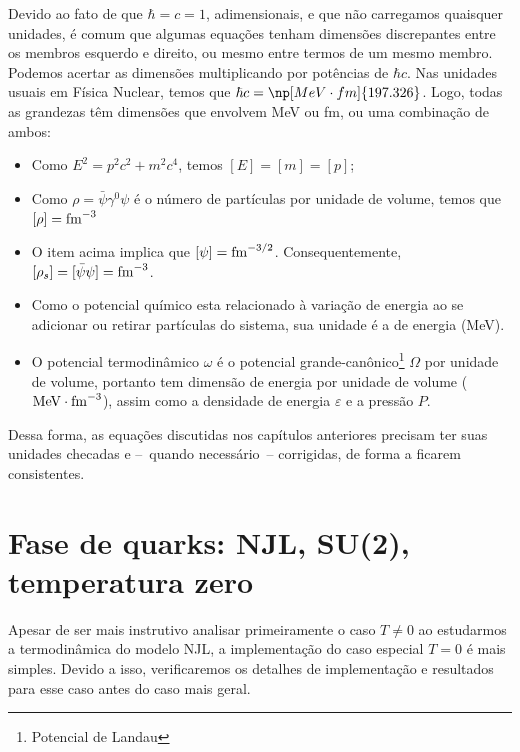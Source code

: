 Devido ao fato de que $\hbar = c = 1$, adimensionais, e que não carregamos quaisquer unidades, é comum que algumas equações tenham dimensões discrepantes entre os membros esquerdo e direito, ou mesmo entre termos de um mesmo membro. Podemos acertar as dimensões multiplicando por potências de $\hbar c$. Nas unidades usuais em Física Nuclear, temos que $\hbar c = \np[MeV\cdot fm]{197.326}$. Logo, todas as grandezas têm dimensões que envolvem MeV ou fm, ou uma combinação de ambos:

\begin{itemize}
	\item Como $E^2 = p^2c^2 + m^2c^4$, temos $[E] = [m] = [p]$;
	\item Como $\rho = \bar{\psi}\gamma^0\psi$ é o número de partículas por unidade de volume, temos que $[\rho] = \rm{fm}^{-3}$
	\item O item acima implica que $[\psi] = \rm{fm}^{-3/2}$. Consequentemente, $[\rho_s] = [\bar{\psi}\psi] = \rm{fm}^{-3}$. 
	\item Como o potencial químico esta relacionado à variação de energia ao se adicionar ou retirar partículas do sistema, sua unidade é a de energia (MeV).
	\item O potencial termodinâmico $\omega$ é o potencial grande-canônico\footnote{Potencial de Landau} $\Omega$ por unidade de volume, portanto tem dimensão de energia por unidade de volume ($\rm{MeV}\cdot\rm{fm}^{-3}$), assim como a densidade de energia $\varepsilon$ e a pressão $P$.
\end{itemize}
%
Dessa forma, as equações discutidas nos capítulos anteriores precisam ter suas unidades checadas e --~quando necessário~-- corrigidas, de forma a ficarem consistentes.

\section{Fase de quarks: NJL, SU(2), temperatura zero}

Apesar de ser mais instrutivo analisar primeiramente o caso $T \neq 0$ ao estudarmos a termodinâmica do modelo NJL, a implementação do caso especial $T = 0$ é mais simples. Devido a isso, verificaremos os detalhes de implementação e resultados para esse caso antes do caso mais geral.

